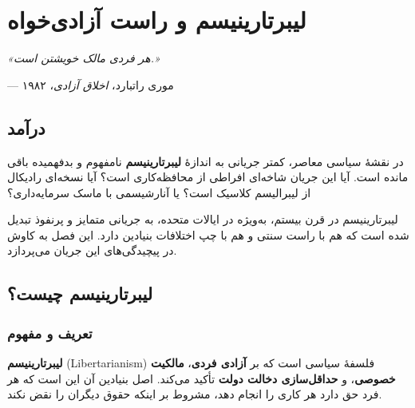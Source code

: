 \chapter{لیبرتارینیسم و راست آزادی‌خواه}

\begin{tcolorbox}[
    enhanced,
    colback=VeryLightGray, %
    colframe=GoldAccent, %
    boxrule=2pt,
    arc=8pt,
    fonttitle=\bfseries\large,
    title={\rl{نقل‌قول آغازین}},
    attach boxed title to top center={yshift=-3mm},
    boxed title style={colback=goldaccent, colframe=goldaccent}
]
\begin{center}
\Large\textit{«هر فردی مالک خویشتن است.»}

\vspace{3mm}
\normalsize
--- موری راتبارد، \textit{اخلاق آزادی}، ۱۹۸۲
\end{center}
\end{tcolorbox}

\vspace{5mm}

\section*{درآمد}


در نقشهٔ سیاسی معاصر، کمتر جریانی به اندازهٔ \textbf{لیبرتارینیسم} نامفهوم و بدفهمیده باقی مانده است. آیا این جریان شاخه‌ای افراطی از محافظه‌کاری است؟ آیا نسخه‌ای رادیکال از لیبرالیسم کلاسیک است؟ یا آنارشیسمی با ماسک سرمایه‌داری؟

لیبرتارینیسم در قرن بیستم، به‌ویژه در ایالات متحده، به جریانی متمایز و پرنفوذ تبدیل شده است که هم با راست سنتی و هم با چپ اختلافات بنیادین دارد. این فصل به کاوش در پیچیدگی‌های این جریان می‌پردازد.

\section{لیبرتارینیسم چیست؟}

\subsection{تعریف و مفهوم}

\begin{tcolorbox}[
    enhanced,
    colback=RightBlue!8, %
    colframe=RightBlue, %
    boxrule=1.5pt,
    arc=5pt,
    fonttitle=\bfseries,
    title={\rl{(i) تعریف کلیدی: لیبرتارینیسم}} %
]
\textbf{لیبرتارینیسم} (Libertarianism) فلسفهٔ سیاسی است که بر \textbf{آزادی فردی}، \textbf{مالکیت خصوصی}، و \textbf{حداقل‌سازی دخالت دولت} تأکید می‌کند. اصل بنیادین آن این است که هر فرد حق دارد هر کاری را انجام دهد، مشروط بر اینکه حقوق دیگران را نقض نکند.
\end{tcolorbox}


